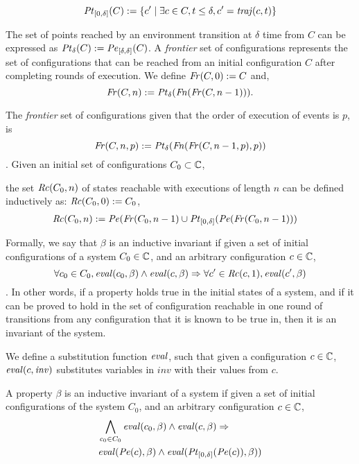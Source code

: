 $$\mathit{Pt}_{[0,\delta]}(C) := \left\{c^\prime \mid \exists c\in C, t\leq \delta , c^\prime = \mathit{traj}(c,t)\right\}$$

The set of points reached by an environment transition at $\delta$ time from $C$ can be expressed as $\mathit{Pt}_\delta(C) := \mathit{Pe}_{[\delta,\delta]}(C)$. A \emph{frontier} set of configurations represents the set of configurations that can be reached from an initial configuration $C$ after completing rounds of execution. We define $\mathit{Fr}(C,0) := C$ and,
$$\mathit{Fr}(C,n) := \mathit{Pt}_\delta(\mathit{Fn}(\mathit{Fr}(C,n-1))).$$

The \emph{frontier} set of configurations given that the order of execution of events is $p$, is $$\mathit{Fr}(C,n,p) :=\mathit{Pt}_\delta(\mathit{Fn}(\mathit{Fr}(C,n-1,p),p))$$. Given an initial set of configurations $C_0\subset\mathbb{C}$,

the set $\mathit{Rc}(C_0,n)$ of  states reachable with executions of length $n$ can be defined inductively as: $\mathit{Rc}(C_0,0) := C_0$,
\begin{align*}
\mathit{Rc}(C_0,n) &:= \mathit{Pe}(\mathit{Fr}(C_0,n-1) \cup \mathit{Pt}_{[0,\delta]}(\mathit{Pe}(\mathit{Fr}(C_0,n-1)))
\end{align*}



 Formally, we say that $\beta$ is an inductive invariant if given a set of initial configurations of a system $C_0 \in \mathbb{C}$, and an arbitrary configuration $c \in \mathbb{C}$,  $$\forall c_0 \in C_0, \mathit{eval}(c_0, \beta) \wedge  \mathit{eval}(c , \beta) \Rightarrow \forall c^\prime \in \mathit{Rc}(c,1), \mathit{eval}(c^\prime,\beta)$$. In other words, if a property holds true in the initial states of a system, and if it can be proved to hold in the set of configuration reachable in one round of transitions from any configuration that it is known to be true in, then it is an invariant of the system.

We  define a substitution function $\mathit{eval}$, such that given a configuration $c \in \mathbb{C}$, $\mathit{eval}(c,\mathit{inv})$ substitutes variables in $\mathit{inv}$ with their values from $c$.


\begin{definition}
\label{def:ii}
A property $\beta$ is an inductive invariant of a system if given a set of initial configurations of the system $C_0$, and an arbitrary configuration $c\in \mathbb{C}$,
\begin{align*}
&\bigwedge_{c_0\in C_0}\mathit{eval}(c_0, \beta) \wedge \mathit{eval}(c,\beta) \Rightarrow\\ &\mathit{eval}(\mathit{Pe}(c),\beta)\wedge \mathit{eval}(\mathit{Pt}_{[0,\delta]}(\mathit{Pe}(c)),\beta))
\end{align*}
\end{definition}


